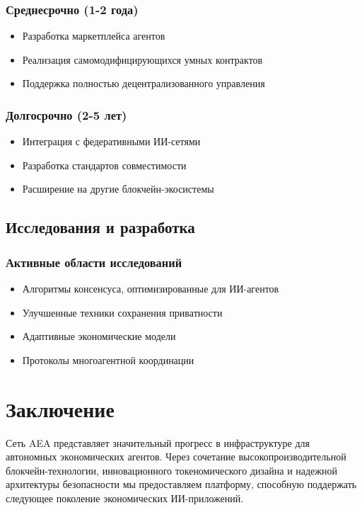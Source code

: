 \documentclass[12pt,a4paper]{article}
\begin{document}
\subsubsection{Среднесрочно (1-2 года)}
\begin{itemize}
\item Разработка маркетплейса агентов
\item Реализация самомодифицирующихся умных контрактов
\item Поддержка полностью децентрализованного управления
\end{itemize}

\subsubsection{Долгосрочно (2-5 лет)}
\begin{itemize}
\item Интеграция с федеративными ИИ-сетями
\item Разработка стандартов совместимости
\item Расширение на другие блокчейн-экосистемы
\end{itemize}

\subsection{Исследования и разработка}

\subsubsection{Активные области исследований}
\begin{itemize}
\item Алгоритмы консенсуса, оптимизированные для ИИ-агентов
\item Улучшенные техники сохранения приватности
\item Адаптивные экономические модели
\item Протоколы многоагентной координации
\end{itemize}

\section{Заключение}

Сеть AEA представляет значительный прогресс в инфраструктуре для автономных экономических агентов. Через сочетание высокопроизводительной блокчейн-технологии, инновационного токеномического дизайна и надежной архитектуры безопасности мы предоставляем платформу, способную поддержать следующее поколение экономических ИИ-приложений.
\end{document}
